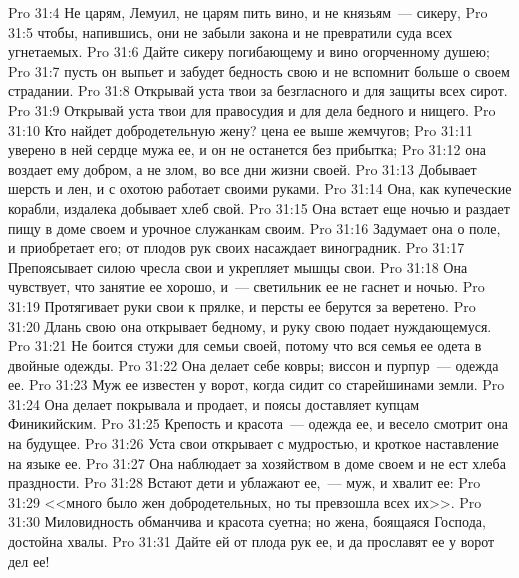 \vs Pro 31:4 Не царям, Лемуил, не царям пить вино, и не князьям~--- сикеру,
\vs Pro 31:5 чтобы, напившись, они не забыли закона и не превратили суда всех угнетаемых.
\vs Pro 31:6 Дайте сикеру погибающему и вино огорченному душею;
\vs Pro 31:7 пусть он выпьет и забудет бедность свою и не вспомнит больше о своем страдании.
\vs Pro 31:8 Открывай уста твои за безгласного и для защиты всех сирот.
\vs Pro 31:9 Открывай уста твои для правосудия и для дела бедного и нищего.
\rsbpar\vs Pro 31:10 Кто найдет добродетельную жену? цена ее выше жемчугов;
\vs Pro 31:11 уверено в ней сердце мужа ее, и он не останется без прибытка;
\vs Pro 31:12 она воздает ему добром, а не злом, во все дни жизни своей.
\vs Pro 31:13 Добывает шерсть и лен, и с охотою работает своими руками.
\vs Pro 31:14 Она, как купеческие корабли, издалека добывает хлеб свой.
\vs Pro 31:15 Она встает еще ночью и раздает пищу в доме своем и урочное служанкам своим.
\vs Pro 31:16 Задумает она о поле, и приобретает его; от плодов рук своих насаждает виноградник.
\vs Pro 31:17 Препоясывает силою чресла свои и укрепляет мышцы свои.
\vs Pro 31:18 Она чувствует, что занятие ее хорошо, и~--- светильник ее не гаснет и ночью.
\vs Pro 31:19 Протягивает руки свои к прялке, и персты ее берутся за веретено.
\vs Pro 31:20 Длань свою она открывает бедному, и руку свою подает нуждающемуся.
\vs Pro 31:21 Не боится стужи для семьи своей, потому что вся семья ее одета в двойные одежды.
\vs Pro 31:22 Она делает себе ковры; виссон и пурпур~--- одежда ее.
\vs Pro 31:23 Муж ее известен у ворот, когда сидит со старейшинами земли.
\vs Pro 31:24 Она делает покрывала и продает, и поясы доставляет купцам Финикийским.
\vs Pro 31:25 Крепость и красота~--- одежда ее, и весело смотрит она на будущее.
\vs Pro 31:26 Уста свои открывает с мудростью, и кроткое наставление на языке ее.
\vs Pro 31:27 Она наблюдает за хозяйством в доме своем и не ест хлеба праздности.
\vs Pro 31:28 Встают дети и ублажают ее,~--- муж, и хвалит ее:
\vs Pro 31:29 <<много было жен добродетельных, но ты превзошла всех их>>.
\vs Pro 31:30 Миловидность обманчива и красота суетна; но жена, боящаяся Господа, достойна хвалы.
\vs Pro 31:31 Дайте ей от плода рук ее, и да прославят ее у ворот дел ее!
